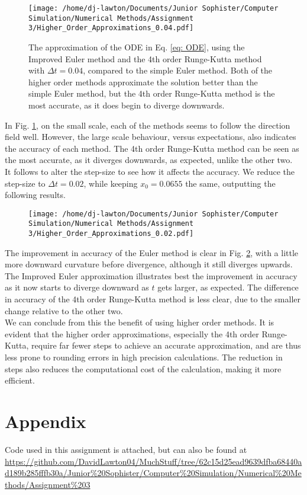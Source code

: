 \documentclass{article}
\theoremstyle{definition}
\theoremstyle{remark}
\begin{document}
\begin{figure}[H]
    \texttt{[image: /home/dj-lawton/Documents/Junior Sophister/Computer Simulation/Numerical Methods/Assignment 3/Higher\_Order\_Approximations\_0.04.pdf]}
    \caption{\label{fig: Higher order methods 0.04} The approximation of the ODE in Eq. \ref{eq: ODE}, using the Improved Euler method and the 4th order Runge-Kutta method with $\Delta t = 0.04$, compared to the simple Euler method. Both of the higher order methods approximate the solution better than the simple Euler method, but the 4th order Runge-Kutta method is the most accurate, as it does begin to diverge downwards.} 
\end{figure}
In Fig. \ref{fig: Higher order methods 0.04}, on the small scale, each of the methods seems to follow the direction field well. However, the large scale behaviour, versus expectations, also indicates the accuracy of each method. The 4th order Runge-Kutta method can be seen as the most accurate, as it diverges downwards, as expected, unlike the other two.\\
\indent It follows to alter the step-size to see how it affects the accuracy. We reduce the step-size to $\Delta t = 0.02$, while keeping $x_0=0.0655$ the same, outputting the following results.
\begin{figure}[H]
    \centering
    \texttt{[image: /home/dj-lawton/Documents/Junior Sophister/Computer Simulation/Numerical Methods/Assignment 3/Higher\_Order\_Approximations\_0.02.pdf]}
    \caption{\label{fig: Higher order methods 0.02} }
\end{figure}
The improvement in accuracy of the Euler method is clear in Fig. \ref{fig: Higher order methods 0.02}, with a little more downward curvature before divergence, although it still diverges upwards. The Improved Euler approximation illustrates best the improvement in accuracy as it now starts to diverge downward as $t$ gets larger, as expected. The difference in accuracy of the 4th order Runge-Kutta method is less clear, due to the smaller change relative to the other two.\\
\indent We can conclude from this the benefit of using higher order methods. It is evident that the higher order approximations, especially the 4th order Runge-Kutta, require far fewer steps to achieve an accurate approximation, and are thus less prone to rounding errors in high precision calculations. The reduction in steps also reduces the computational cost of the calculation, making it more efficient.\\

\section{Appendix}
Code used in this assignment is attached, but can also be found at \url{https://github.com/DavidLawton04/MuchStuff/tree/62c15d25ead9639dfba68440ad189b285fffb30a/Junior%20Sophister/Computer%20Simulation/Numerical%20Methods/Assignment%203}



\end{document}
